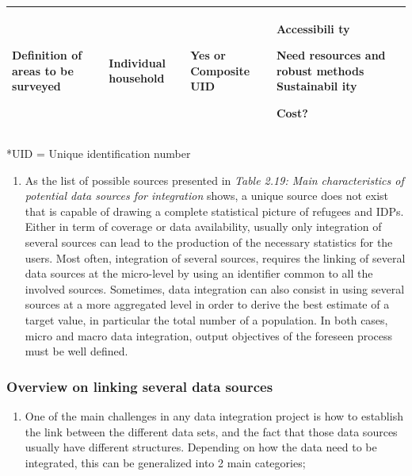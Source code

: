 \documentclass[
]{article}
\providecommand{\tightlist}{%
  \setlength{\itemsep}{0pt}\setlength{\parskip}{0pt}}
\begin{document}
\begin{longtable}[]{@{}lllll@{}}
\begin{minipage}[t]{0.17\columnwidth}
Definition
of areas to
be surveyed\strut
\end{minipage} & \begin{minipage}[t]{0.17\columnwidth}\raggedright
Individual
household\strut
\end{minipage} & \begin{minipage}[t]{0.17\columnwidth}\raggedright
Yes or
Composite
UID\strut
\end{minipage} & \begin{minipage}[t]{0.17\columnwidth}\raggedright
Accessibili
ty

Need
resources
and robust
methods
Sustainabil
ity

Cost?\strut
\end{minipage}\tabularnewline
\bottomrule
\end{longtable}

*UID = Unique identification number

\begin{enumerate}
\def\labelenumi{\arabic{enumi}.}
\setcounter{enumi}{215}
\tightlist
\item
  As the list of possible sources presented in \emph{Table 2.19: Main
  characteristics of potential data sources for integration} shows, a
  unique source does not exist that is capable of drawing a complete
  statistical picture of refugees and IDPs. Either in term of coverage
  or data availability, usually only integration of several sources
  can lead to the production of the necessary statistics for the
  users. Most often, integration of several sources, requires the
  linking of several data sources at the micro-level by using an
  identifier common to all the involved sources. Sometimes, data
  integration can also consist in using several sources at a more
  aggregated level in order to derive the best estimate of a target
  value, in particular the total number of a population. In both
  cases, micro and macro data integration, output objectives of the
  foreseen process must be well defined.
\end{enumerate}

\hypertarget{d.4.-overview-on-linking-several-data-sources}{%
\subsubsection{Overview on linking several data sources}\label{d.4.-overview-on-linking-several-data-sources}}

\begin{enumerate}
\def\labelenumi{\arabic{enumi}.}
\setcounter{enumi}{216}
\tightlist
\item
  One of the main challenges in any data integration project is how
  to establish the link between the different data sets, and the fact
  that those data sources usually have different structures. Depending
  on how the data need to be integrated, this can be generalized into
  2 main categories;
\end{enumerate}
\end{document}
